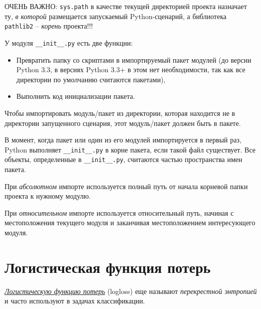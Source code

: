 \documentclass[%
	11pt,
	a4paper,
	utf8,
		]{article}
\begin{document}

{\color{red}ОЧЕНЬ ВАЖНО: \texttt{sys.path} в качестве текущей директорией проекта назначает ту, \emph{в которой} размещается запускаемый Python-сценарий, а библиотека \texttt{pathlib2} -- \emph{корень} проекта!!!}

У модуля \verb|__init__.py| есть две функции:
\begin{itemize}
	\item Превратить папку со скриптами в импортируемый пакет модулей (до версии Python 3.3, в версиях Python 3.3+ в этом нет необходимости, так как все директории по умолчанию считаются пакетами),
	
	\item Выполнить код инициализации пакета.
\end{itemize}

Чтобы импортировать модуль/пакет из директории, которая находится не в директории запущенного сценария, этот модуль/пакет должен быть в пакете.

В момент, когда пакет или один из его модулей импортируется в первый раз, Python выполняет \verb|__init__.py| в корне пакета, если такой файл существует. Все объекты, определенные в \verb|__init__.py|, считаются частью пространства имен пакета.


При \emph{абсолютном} импорте используется полный путь от начала корневой папки проекта к нужному модулю.

При \emph{относительном} импорте используется относительный путь, начиная с местоположения текущего модуля и заканчивая местоположением интересующего модуля.


\section{Логистическая функция потерь}

\href{https://dyakonov.org/2018/03/12/логистическая-функция-ошибки/}{\emph{Логистическую функцию потерь}} (logloss) еще называют \emph{перекрестной энтропией} и часто используют в задачах классификации.
\end{document}
